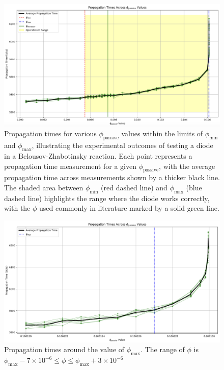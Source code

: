 \begin{figure}[H]
    \centering
    \includegraphics[width=\linewidth]{Screenshot 2024-03-09 at 10.35.01.png}
    \caption{Propagation times for various $\phi_{\text{passive}}$ values within the limits of $\phi_{\text{min}}$ and $\phi_{\text{max}}$, 
    illustrating the experimental outcomes of testing a diode in a Belousov-Zhabotinsky reaction. 
    Each point represents a propagation time measurement for a given $\phi_{\text{passive}}$, 
    with the average propagation time across measurements shown by a thicker black line. 
    The shaded area between $\phi_{\text{min}}$ (red dashed line) and $\phi_{\text{max}}$ (blue dashed line) highlights the range 
    where the diode works correctly, with the $\phi$ used commonly in literature marked by a solid green line.}
    \label{fig:phi_passive_propagation_times}
    
\end{figure}

\begin{figure}[H]
    \centering
    \includegraphics[width=1\linewidth]{Screenshot 2024-03-10 at 07.50.59.png}
    \caption{Propagation times around the value of $\phi_{\text{max}}$. The range of $\phi$ is $\phi_{\text{max}} - 7 \times 10^{-6} \leq \phi \leq \phi_{\text{max}} + 3 \times 10^{-6}$}
    \label{fig:phi_passive_propagation_times_detail_max}
\end{figure}



